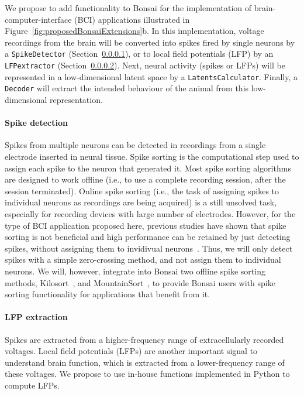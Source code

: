 We propose to add functionality to Bonsai for the implementation of
brain-computer-interface (BCI) applications illustrated in
Figure~\ref{fig:proposedBonsaiExtensions}b. In
this implementation, voltage recordings from the brain will be converted into
spikes fired by single neurons by a \texttt{SpikeDetector}
(Section~\ref{sec:spikeDetection}), or to local field potentials (LFP) by an
\texttt{LFPextractor} (Section~\ref{sec:lfpExtraction}). Next, neural activity
(spikes or LFPs) will be represented in a low-dimensional latent space by a
\texttt{LatentsCalculator}. Finally, a \texttt{Decoder} will extract the
intended behaviour of the animal from this low-dimensional representation.

\paragraph{Spike detection}
\label{sec:spikeDetection}

Spikes from multiple neurons can be detected in recordings from a single
electrode inserted in neural tissue. Spike sorting is the computational step
used to assign each spike to the neuron that generated it. Most spike sorting
algorithms are designed to work offline (i.e., to use a complete recording
session, after the session terminated). Online spike sorting (i.e., the task
of assigning spikes to individual neurons as recordings are being acquired) is a
still unsolved task, especially for recording devices with large number of
electrodes.
%
However, for the type of BCI application proposed here, previous studies have
shown that spike sorting is not beneficial and high performance can be retained
by just detecting spikes, without assigning them to invidivual
neurons~\citep{trautmannEtAl19,todorovaEtAl14}. Thus, we will only detect spikes with a simple zero-crossing method,
and not assign them to individual neurons.  We will, however, integrate into
Bonsai two offline spike sorting methods, Kilosort~\citep[][written in Matlab]{pachitariuEtAl16}, and MountainSort~\citep[][written in
Python]{chungEtAl17}, to provide Bonsai users with spike sorting functionality for
applications that benefit from it.

\paragraph{LFP extraction}
\label{sec:lfpExtraction}

Spikes are extracted from a higher-frequency range of extracellularly recorded
voltages. Local field potentials (LFPs) 
are another important signal to understand brain function, which is extracted
from a lower-frequency range of these voltages. We propose to use in-house
functions implemented in Python to compute LFPs.

